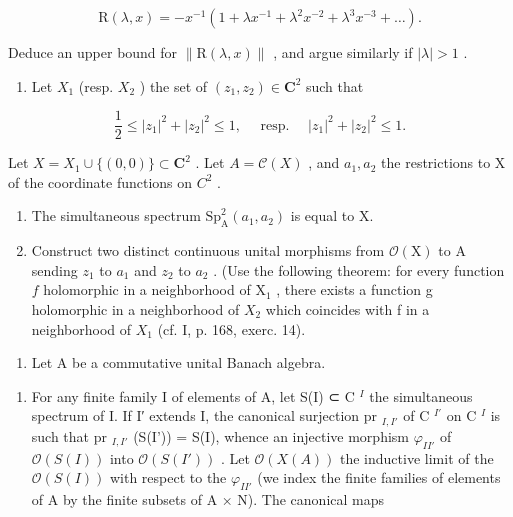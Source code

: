 \[
\mathrm{R} (\lambda , x) = - x ^ {- 1} \left(1 + \lambda x ^ {- 1} + \lambda^ {2} x ^ {- 2} + \lambda^ {3} x ^ {- 3} + \dots\right).
\]

Deduce an upper bound for \(\|\mathrm{R}(\lambda,x)\|\) , and argue similarly if \(|\lambda|>1\) .

\begin{enumerate}
\def\labelenumi{\arabic{enumi})}
\setcounter{enumi}{16}
\tightlist
\item
  Let \(X_{1}\) (resp. \(X_{2}\) ) the set of \((z_{1}, z_{2}) \in \mathbf{C}^{2}\) such that
\end{enumerate}

\[
\frac {1}{2} \leqslant | z _ {1} | ^ {2} + | z _ {2} | ^ {2} \leqslant 1, \quad \text { resp. } \quad | z _ {1} | ^ {2} + | z _ {2} | ^ {2} \leqslant 1.
\]

Let \(X = X_{1} \cup \{(0,0)\} \subset \mathbf{C}^{2}\) . Let \(A = \mathcal{C}(X)\) , and \(a_{1}, a_{2}\) the restrictions to X of the coordinate functions on \(C^{2}\) .

\begin{enumerate}
\def\labelenumi{\alph{enumi})}
\item
  The simultaneous spectrum \(\mathrm{Sp}_{\mathrm{A}}^{2}(a_{1},a_{2})\) is equal to X.
\item
  Construct two distinct continuous unital morphisms from \(\mathcal{O}(\mathrm{X})\) to A sending \(z_{1}\) to \(a_{1}\) and \(z_{2}\) to \(a_{2}\) . (Use the following theorem: for every function \(f\) holomorphic in a neighborhood of \(\mathrm{X}_{1}\) , there exists a function g holomorphic in a neighborhood of \(X_{2}\) which coincides with f in a neighborhood of \(X_{1}\) (cf. I, p. 168, exerc. 14).
\end{enumerate}

\begin{enumerate}
\def\labelenumi{¶ \arabic{enumi})}
\setcounter{enumi}{17}
\tightlist
\item
  Let A be a commutative unital Banach algebra.
\end{enumerate}

\begin{enumerate}
\def\labelenumi{\alph{enumi})}
\tightlist
\item
  For any finite family I of elements of A, let S(I) ⊂ C \(^{I}\) the simultaneous spectrum of I. If I′ extends I, the canonical surjection pr \(_{I,I'}\) of C \(^{I'}\) on C \(^{I}\) is such that pr \(_{I,I'}\) (S(I')) = S(I), whence an injective morphism \(\varphi_{II'}\) of \(\mathcal{O}(S(I))\) into \(\mathcal{O}(S(I'))\) . Let \(\mathcal{O}(X(A))\) the inductive limit of the \(\mathcal{O}(S(I))\) with respect to the \(\varphi_{II'}\) (we index the finite families of elements of A by the finite subsets of A × N). The canonical maps
\end{enumerate}

